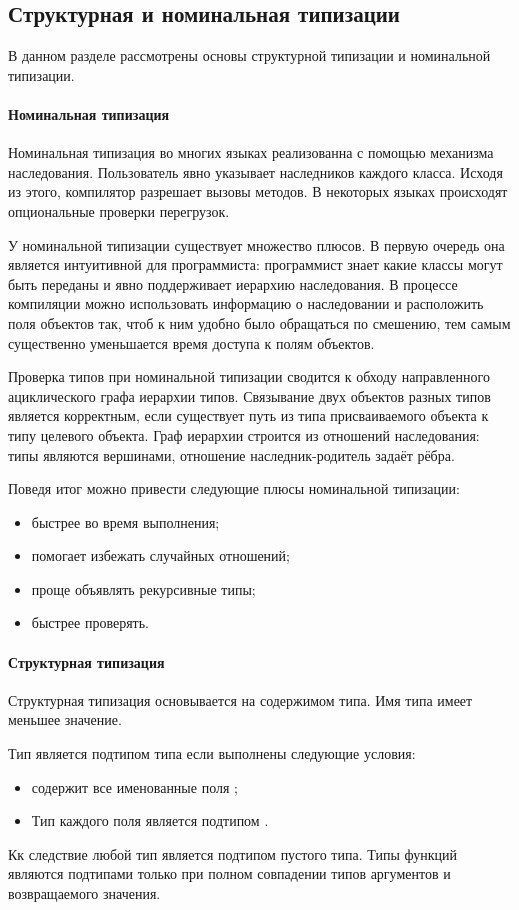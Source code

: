 \subsection{Структурная и номинальная типизации}
В данном разделе рассмотрены основы структурной типизации и номинальной типизации.

\paragraph{Номинальная типизация}
Номинальная типизация во многих языках реализованна с помощью механизма наследования\cite{book:pierce}. Пользователь явно указывает наследников каждого класса. Исходя из этого, компилятор разрешает вызовы методов. В некоторых языках происходят опциональные проверки перегрузок.

У номинальной типизации существует множество плюсов. В первую очередь она является интуитивной для программиста: программист знает какие классы могут быть переданы и явно поддерживает иерархию наследования. В процессе компиляции можно использовать информацию о наследовании и расположить поля объектов так, чтоб к ним удобно было обращаться по смешению, тем самым существенно уменьшается время доступа к полям объектов.

Проверка типов при номинальной типизации сводится к обходу направленного ациклического графа иерархии типов. Связывание двух объектов разных типов является корректным, если существует путь из типа присваиваемого объекта к типу целевого объекта. Граф иерархии строится из отношений наследования: типы являются вершинами, отношение наследник-родитель задаёт рёбра.

Поведя итог можно привести следующие плюсы номинальной типизации:
\begin{itemize}
    \item быстрее во время выполнения;
    \item помогает избежать случайных отношений;
    \item проще объявлять рекурсивные типы;
    \item быстрее проверять.
\end{itemize}

\paragraph{Структурная типизация}
Структурная типизация основывается на содержимом типа\cite{book:pierce}. Имя типа имеет меньшее значение.

Тип  является подтипом типа  если выполнены следующие условия:
\begin{itemize}
    \item {} содержит все именованные поля ;
    \item Тип каждого поля  является подтипом .
\end{itemize}
Кк следствие любой тип является подтипом пустого типа. Типы функций являются подтипами только при полном совпадении типов аргументов и возвращаемого значения.

